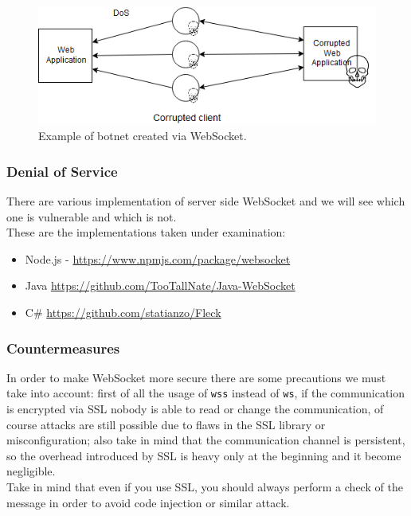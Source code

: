 	\begin{figure}
		\includegraphics[width=\linewidth]{ws-vuln-img0.png}
		\caption{Example of botnet created via WebSocket.}
		\label{fig:ws-vuln0}
	\end{figure}
	
	\subsubsection{Denial of Service}
	There are various implementation of server side WebSocket and we will see which one is vulnerable and which is not.\\
	These are the implementations taken under examination:
	\begin{itemize}
		\item Node.js - \url{https://www.npmjs.com/package/websocket}
		\item Java \url{https://github.com/TooTallNate/Java-WebSocket}
		\item C\# \url{https://github.com/statianzo/Fleck}
	\end{itemize}

	\subsubsection{Countermeasures}
	In order to make WebSocket more secure there are some precautions we must take into account: first of all the usage of \texttt{wss} instead of \texttt{ws}, if the
	communication is encrypted via SSL nobody is able to read or change the communication, of course attacks are still possible due to flaws in the SSL library or misconfiguration;
	also take in mind that the communication channel is persistent, so the overhead introduced by SSL is heavy only at the beginning and it become negligible\cite{koch2013websockets}.\\
	Take in mind that even if you use SSL, you should always perform a check of the message in order to avoid code injection or similar attack.\\
	
